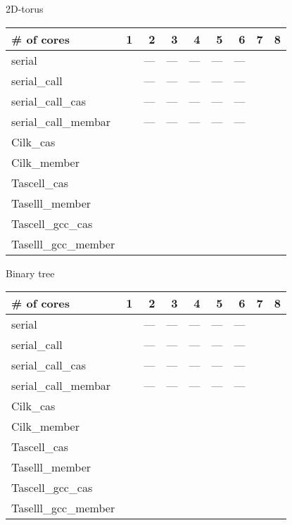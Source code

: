 \documentclass{article}
\begin{document}
2D-torus
\begin{tabular}{l|r|r|r|r|r|r|r|r}
\# of cores  &1&2&3&4&5&6&7&8 \\ \hline \hline
serial               & &---&---&---&---&---& \\ \hline
serial\_call         & &---&---&---&---&---& \\ \hline
serial\_call\_cas    & &---&---&---&---&---& \\ \hline
serial\_call\_membar & &---&---&---&---&---& \\ \hline
Cilk\_cas            & & & & & & & \\ \hline
Cilk\_member         & & & & & & & \\ \hline
Tascell\_cas         & & & & & & & \\ \hline
Taselll\_member      & & & & & & & \\ \hline
Tascell\_gcc\_cas    & & & & & & & \\ \hline
Taselll\_gcc\_member & & & & & & & \\
\end{tabular}

Binary tree
\begin{tabular}{l|r|r|r|r|r|r|r|r}
\# of cores  &1&2&3&4&5&6&7&8 \\ \hline \hline
serial               & &---&---&---&---&---& \\ \hline
serial\_call         & &---&---&---&---&---& \\ \hline
serial\_call\_cas    & &---&---&---&---&---& \\ \hline
serial\_call\_membar & &---&---&---&---&---& \\ \hline
Cilk\_cas            & & & & & & & \\ \hline
Cilk\_member         & & & & & & & \\ \hline
Tascell\_cas         & & & & & & & \\ \hline
Taselll\_member      & & & & & & & \\ \hline
Tascell\_gcc\_cas    & & & & & & & \\ \hline
Taselll\_gcc\_member & & & & & & & \\
\end{tabular}
\end{document}
